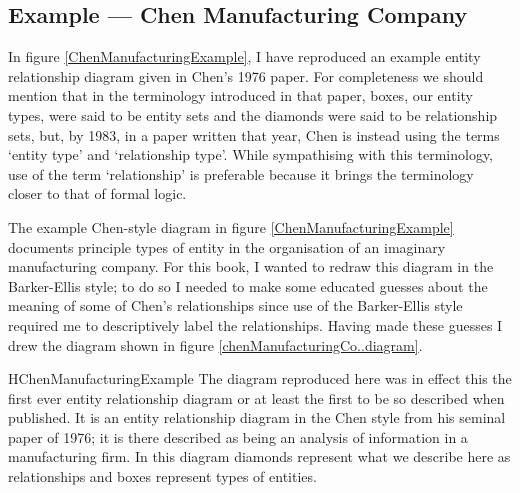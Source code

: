 \subsection{Example --- Chen Manufacturing Company}
\label{ChenManufacturingCompany}
In figure \ref{ChenManufacturingExample}, I have reproduced an example entity relationship diagram  given in Chen's 1976 paper. 
For completeness we should mention that in the terminology introduced in that  paper, boxes, our entity types, were said to be entity sets and the diamonds were said to be relationship sets, but, by 1983, in a paper written that year, Chen is instead using the terms `entity type' and `relationship type'. While sympathising with this terminology, use of the term `relationship' is preferable because it brings the terminology closer to that of formal logic.

\mynote
The example Chen-style diagram in figure \ref{ChenManufacturingExample} documents principle types of entity in the organisation of an imaginary manufacturing company.  For this book, I wanted to redraw
this diagram in the Barker-Ellis style; to do so I needed to make some educated guesses about the meaning of some of Chen's relationships since use of the Barker-Ellis style  required me to descriptively label the relationships. Having made these guesses I drew the diagram shown
 in figure \ref{chenManufacturingCo..diagram}. 

\begin{erboxedFigure} {H}{ChenManufacturingExample}{
The diagram reproduced here was in effect this the first ever entity relationship diagram or at least the first to be so described when published. 
It is an entity relationship diagram in the Chen style from his seminal paper of 1976; it is there described as being an analysis of information in a manufacturing firm. In this diagram
diamonds represent what we describe here as relationships and boxes represent types of entities.  
}
\begin{center}
\scalebox{0.80}{}
\end{center}
\end{erboxedFigure}

